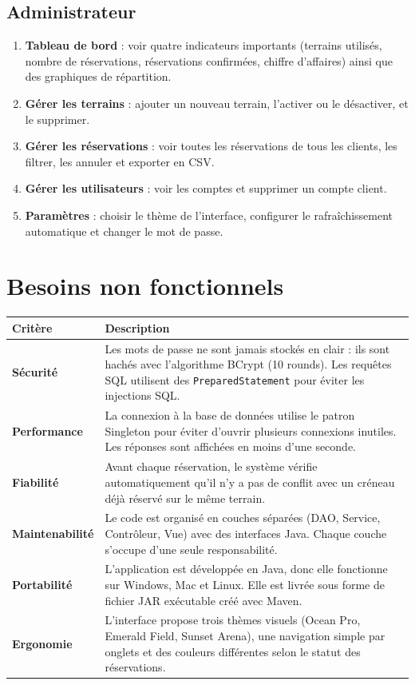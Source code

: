 \documentclass[12pt, a4paper]{report}
\begin{document}
\subsection{Administrateur}

\begin{enumerate}
  \item \textbf{Tableau de bord} : voir quatre indicateurs importants
        (terrains utilisés, nombre de réservations, réservations confirmées,
        chiffre d'affaires) ainsi que des graphiques de répartition.
  \item \textbf{Gérer les terrains} : ajouter un nouveau terrain, l'activer
        ou le désactiver, et le supprimer.
  \item \textbf{Gérer les réservations} : voir toutes les réservations
        de tous les clients, les filtrer, les annuler et exporter en CSV.
  \item \textbf{Gérer les utilisateurs} : voir les comptes et supprimer
        un compte client.
  \item \textbf{Paramètres} : choisir le thème de l'interface, configurer
        le rafraîchissement automatique et changer le mot de passe.
\end{enumerate}

\section{Besoins non fonctionnels}

\begin{center}
\begin{tabular}{>{\bfseries}p{3.5cm} p{9.5cm}}
\toprule
Critère & Description \\
\midrule
Sécurité &
  Les mots de passe ne sont jamais stockés en clair : ils sont hachés
  avec l'algorithme BCrypt (10 rounds). Les requêtes SQL utilisent des
  \texttt{PreparedStatement} pour éviter les injections SQL. \\
\addlinespace
Performance &
  La connexion à la base de données utilise le patron Singleton pour
  éviter d'ouvrir plusieurs connexions inutiles. Les réponses sont
  affichées en moins d'une seconde. \\
\addlinespace
Fiabilité &
  Avant chaque réservation, le système vérifie automatiquement qu'il
  n'y a pas de conflit avec un créneau déjà réservé sur le même terrain. \\
\addlinespace
Maintenabilité &
  Le code est organisé en couches séparées (DAO, Service, Contrôleur,
  Vue) avec des interfaces Java. Chaque couche s'occupe d'une seule
  responsabilité. \\
\addlinespace
Portabilité &
  L'application est développée en Java, donc elle fonctionne sur
  Windows, Mac et Linux. Elle est livrée sous forme de fichier JAR
  exécutable créé avec Maven. \\
\addlinespace
Ergonomie &
  L'interface propose trois thèmes visuels (Ocean Pro, Emerald Field,
  Sunset Arena), une navigation simple par onglets et des couleurs
  différentes selon le statut des réservations. \\
\bottomrule
\end{tabular}
\end{center}
\end{document}
